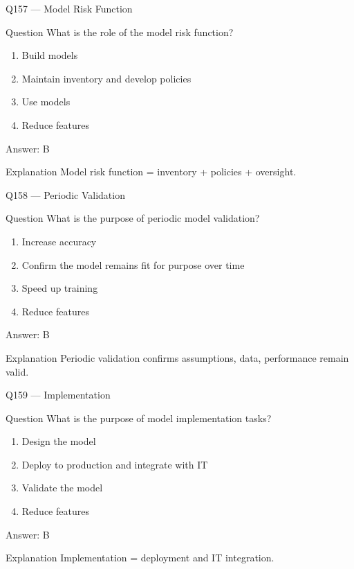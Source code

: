 \documentclass[aspectratio=169,8pt]{beamer}
\begin{document}
	\begin{frame}{Q157 --- Model Risk Function}
		\begin{block}{Question}
			What is the role of the model risk function?
		\end{block}
		\begin{enumerate}
			\item Build models
			\item Maintain inventory and develop policies
			\item Use models
			\item Reduce features
		\end{enumerate}
		\begin{exampleblock}{Answer: B}\end{exampleblock}
		\begin{block}{Explanation}
			Model risk function = inventory + policies + oversight.
		\end{block}
	\end{frame}
	
	\begin{frame}{Q158 --- Periodic Validation}
		\begin{block}{Question}
			What is the purpose of periodic model validation?
		\end{block}
		\begin{enumerate}
			\item Increase accuracy
			\item Confirm the model remains fit for purpose over time
			\item Speed up training
			\item Reduce features
		\end{enumerate}
		\begin{exampleblock}{Answer: B}\end{exampleblock}
		\begin{block}{Explanation}
			Periodic validation confirms assumptions, data, performance remain valid.
		\end{block}
	\end{frame}
	
	\begin{frame}{Q159 --- Implementation}
		\begin{block}{Question}
			What is the purpose of model implementation tasks?
		\end{block}
		\begin{enumerate}
			\item Design the model
			\item Deploy to production and integrate with IT
			\item Validate the model
			\item Reduce features
		\end{enumerate}
		\begin{exampleblock}{Answer: B}\end{exampleblock}
		\begin{block}{Explanation}
			Implementation = deployment and IT integration.
		\end{block}
	\end{frame}
	
\end{document}
